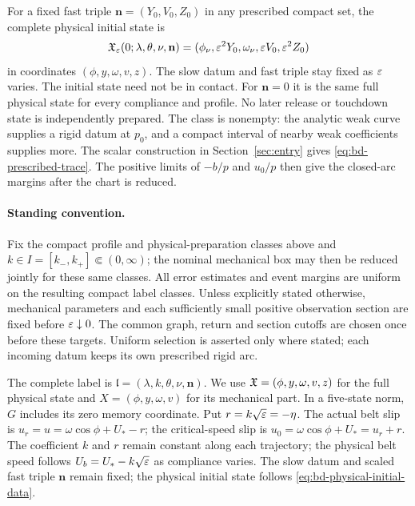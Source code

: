 For a fixed fast triple $\mathbf n=(Y_0,V_0,Z_0)$ in any prescribed
compact set, the complete physical initial state is
\begin{equation}
 \mathfrak X_\varepsilon(0;\lambda,\theta,\nu,\mathbf n)
       =(\phi_\nu,\varepsilon^2Y_0,\omega_\nu,\varepsilon V_0,\varepsilon^2Z_0)
 \label{eq:bd-physical-initial-data}
\end{equation}
in coordinates $(\phi,y,\omega,v,z)$.
The slow datum and fast triple stay fixed as $\varepsilon$ varies.
The initial state need not be in contact. For $\mathbf n=0$ it is
the same full physical state for every compliance and profile.
No later release or touchdown state is independently prepared.
The class is nonempty: the analytic weak curve supplies a rigid
datum at $p_0$, and a compact interval of nearby weak coefficients
supplies more. The scalar construction in Section~\ref{sec:entry} gives
\eqref{eq:bd-prescribed-trace}. The positive limits of $-b/p$ and
$u_0/p$ then give the closed-arc margins after the chart is reduced.

\paragraph{Standing convention.}
Fix the compact profile and physical-preparation classes above and
$k\in I=[k_-,k_+]\Subset(0,\infty)$; the nominal mechanical box
may then be reduced jointly for these same classes. All error
estimates and event margins are uniform on the resulting compact
label classes. Unless explicitly stated otherwise, mechanical
parameters and each sufficiently small positive observation section
are fixed before $\varepsilon\downarrow0$. The common graph, return and
section cutoffs are chosen once before these targets. Uniform
selection is asserted only where stated; each incoming datum keeps
its own prescribed rigid arc.

The complete label is $\mathfrak l=(\lambda,k,\theta,\nu,\mathbf n)$.
We use $\mathfrak X=(\phi,y,\omega,v,z)$ for the full physical state and
$X=(\phi,y,\omega,v)$ for its mechanical part. In a five-state norm,
$G$ includes its zero memory coordinate. Put
$r=k\sqrt{\varepsilon}=-\eta$. The actual belt slip is
$u_r=u=\omega\cos\phi+U_*-r$; the critical-speed slip is
$u_0=\omega\cos\phi+U_*=u_r+r$.
The coefficient $k$ and $r$ remain constant along each trajectory;
the physical belt speed follows $U_b=U_*-k\sqrt{\varepsilon}$ as compliance
varies. The slow datum and scaled fast triple $\mathbf n$ remain fixed;
the physical initial state follows \eqref{eq:bd-physical-initial-data}.
